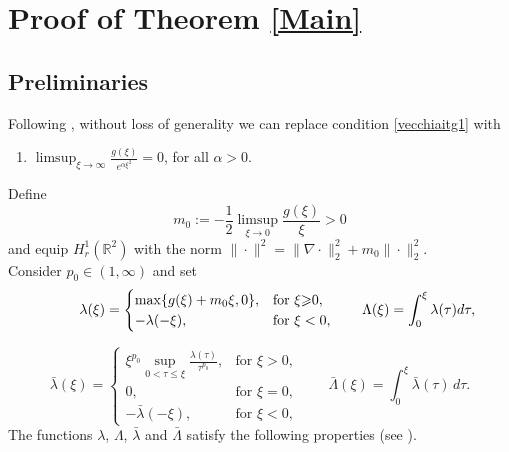\documentclass[11pt,leqno,twoside,reqno]{amsart}
\numberwithin{equation}{section}
\begin{document}
\section{Proof of Theorem \ref{Main}}\label{se:main}

\subsection{Preliminaries}

Following \cite{HIT}, without loss of generality we can replace condition \eqref{vecchiaitg1} with
\begin{enumerate}[label=(g\arabic*'),ref=g\arabic*',start=1]
\item \label{itg1'} $\displaystyle \limsup_{\xi\to\infty}\frac{g(\xi)}{e^{\alpha\xi^{2}}}=  0$, for all $\alpha>0$.
\end{enumerate}

Define
$$m_{0}:=-\frac{1}{2}\limsup_{\xi\to0}\frac{g(\xi)}{\xi}>0$$
and equip ${H^1_r({{\mathbb{R}^2}})}$ with the norm $\|\cdot\|^2=\|{\nabla } \cdot\|^2_2+m_0\|\cdot\|_2^2$.\\

Consider $p_0\in (1,\infty)$ and set 
\[
\hspace{.89cm}{\lambda}(\xi)
=
\begin{cases}
\max\{g(\xi)+m_0\xi, 0\}, & \mbox{for } \xi{\geqslant} 0,\\
-\lambda(-\xi), & \mbox{for }  \xi<0,
\end{cases}
\qquad
{\Lambda}(\xi)=\int_{0}^\xi {\lambda}(\tau)d\tau, 
\]

\[
\bar{\lambda}(\xi)
=
\begin{cases}
\displaystyle 
\xi^{p_0}\sup_{0<\tau{\leqslant}\xi} \frac{\lambda(\tau)}{\tau^{p_0}}, & \mbox{for }  \xi>0,\\
0, & \mbox{for }  \xi=0,\\
-\bar{\lambda}(-\xi), & \mbox{for }  \xi<0,
\end{cases}
\qquad
\bar{\Lambda}(\xi)=\int_{0}^\xi \bar{\lambda}(\tau)\,d\tau. 
\]
The functions ${\lambda}$, ${\Lambda}$, $\bar{\lambda}$ and $\bar{\Lambda}$ satisfy the following properties (see \cite[Lemma 2.1, Corollary 2.2, Lemma 2.3]{HIT}).
\end{document}

